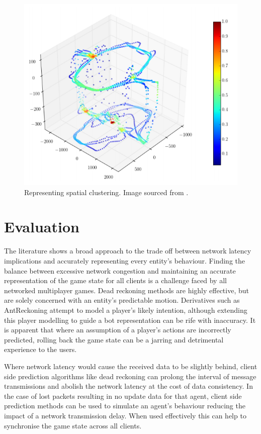 \documentclass[journal]{IEEEtran}
\begin{document}
\begin{figure}[h]
    \centering
    \includegraphics[width=0.8\linewidth]{Heatmap2.png}
    \caption{Representing spatial clustering. Image sourced from \cite{bauckhage2014beyond}.}
    \label{fig:hm2}
\end{figure}


\section{Evaluation}

The literature shows a broad approach to the trade off between network latency implications and accurately representing every entity's behaviour. Finding the balance between excessive network congestion and maintaining an accurate representation of the game state for all clients is a challenge faced by all networked multiplayer games. Dead reckoning methods are highly effective, but are solely concerned with an entity's predictable motion. Derivatives such as AntReckoning attempt to model a player's likely intention, although extending this player modelling to guide a bot representation can be rife with inaccuracy. It is apparent that where an assumption of a player's actions are incorrectly predicted, rolling back the game state can be a jarring and detrimental experience to the users.

Where network latency would cause the received data to be slightly behind, client side prediction algorithms like dead reckoning can prolong the interval of message transmissions and abolish the network latency at the cost of data consistency. In the case of lost packets resulting in no update data for that agent, client side prediction methods can be used to simulate an agent's behaviour reducing the impact of a network transmission delay. When used effectively this can help to synchronise the game state across all clients.
\end{document}

